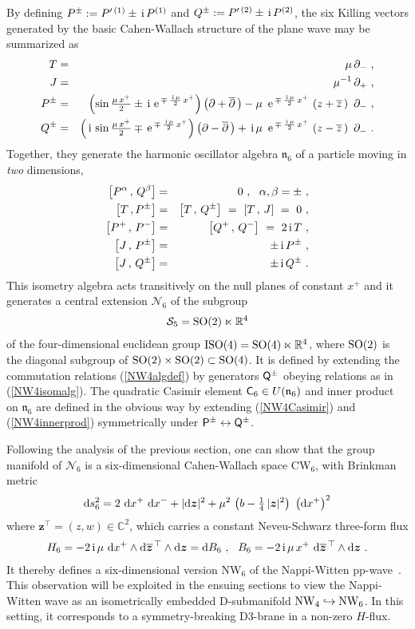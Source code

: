 \documentclass[11pt,a4paper]{article}
\newcommand{\ii}{{\rm i}}
\newcommand{\C}{\complex}
\newcommand{\mbf}[1]{{\boldsymbol {#1} }}
\def\ii{{\,{\rm i}\,}}
\def\dd{{\rm d}}
\def\P{{\sf P}}
\def\Q{{\sf Q}}
\def\C{{\sf C}}
\def\J{{\sf J}}
\def\mz{{\mbf z}}
\newcommand{\complex}{{\mathbb C}} %
\newcommand{\real}{{\mathbb R}} %
\def\nn{\nonumber}
\def\e{{\,\rm e}\,}
\def\bea{\begin{eqnarray}}
\def\eea{\end{eqnarray}}
\newcommand{\beq}{\begin{eqnarray}}
\newcommand{\eeq}{\end{eqnarray}}
\begin{document}
By defining $P^\pm:=P^{\prime\,(1)}\pm\ii P^{(1)}$ and
$ Q{}^{\pm}:=P^{\prime\,(2)}\pm\ii P^{(2)}$, the six
Killing vectors generated by the basic Cahen-Wallach structure of the
plane wave may be summarized as
\bea
T&=&\mu\,\partial_- \ , \nn\\J&=&\mu^{-1}\,\partial_+ \ , \nn\\
P^\pm&=&\left(\sin\mbox{$\frac{\mu\,x^+}2$}\pm\ii\e^{\mp\,
\frac{\ii\mu}2\,x^+}\right)
\left(\partial+\overline{\partial}\,\right)-\mu~\e^{\mp\,
\frac{\ii\mu}2\,x^+}\,\left(
z+\overline{z}\,\right)~\partial_- \ , \nn
\\ Q{}^{\pm}&=&\left(\ii\sin\mbox{$\frac{\mu\,x^+}2$}\mp
\e^{\mp\,\frac{\ii\mu}2\,x^+}\right)
\left(\partial-\overline{\partial}\,\right)+\ii\mu~\e^{\mp\,
\frac{\ii\mu}2\,x^+}\,\left(
z-\overline{z}\,\right)~\partial_- \ .
\label{6CWKilling}\eea
Together, they generate the harmonic oscillator algebra
$\mathfrak{n}_6$ of a particle moving in {\it two} dimensions,
\bea
\left[P^\alpha\,,\, Q{}^{\beta}\right]&=&0 \ , ~~
\alpha,\beta=\pm \ , \nn\\\left[T\,,P^\pm\right]&=&\left[T
\,,\, Q{}^{\pm}\right]~=~\left[T\,,\,J\right]~=~0 \ ,
\nn\\\left[P^+\,,\,P^-\right]&=&\left[Q{}^{+}\,,\,
 Q{}^{-}\right]~=~2\ii T \ , \nn\\\left[J\,,\,
P^\pm\right]&=&\pm\ii P^\pm \ , \nn\\\left[J\,,\, Q{}^{
\pm}\right]&=&\pm\ii Q{}^{\pm} \ .
\label{NW4isomalg}\eea
This isometry algebra acts transitively on the null planes of constant
  $x^+$ and it generates a central extension ${\mathcal
  N}_6$ of the subgroup
\beq
\mathcal{S}_5={\rm SO}(2)\ltimes\real^4
\label{S5subgp}\eeq
of the four-dimensional euclidean group ${\rm
  ISO}(4)={\rm SO}(4)\ltimes\real^4$, where ${\rm SO}(2)$ is the
diagonal subgroup of ${\rm SO}(2)\times{\rm SO}(2)\subset{\rm SO}(4)$.
It is defined by extending the commutation relations (\ref{NW4algdef})
by generators $\Q^{\pm}$ obeying relations as in
(\ref{NW4isomalg}). The quadratic Casimir element $\C_6\in
U(\mathfrak{n}_6)$ and inner product on $\mathfrak{n}_6$ are defined
in the obvious way by extending (\ref{NW4Casimir}) and
(\ref{NW4innerprod}) symmetrically under
$\P^\pm\leftrightarrow\Q^\pm$.

Following the analysis of the previous section, one can show that the
group manifold of ${\mathcal N}_6$ is a six-dimensional Cahen-Wallach
space CW$_6$, with Brinkman metric
\beq
\dd s_6^2=2~\dd x^+~\dd x^-+|\dd\mz|^2+\mu^2\,\left(b-\mbox{$\frac14$}\,
|\mz|^2\right)~\left(\dd x^+\right)^2
\label{NW6metricBrink}\eeq
where $\mz^\top=(z,w)\in\complex^2$, which carries a constant
Neveu-Schwarz three-form flux
\beq
H_6=-2\ii\mu~\dd x^+\wedge\dd\overline{\mz}{}^{\,\top}
\wedge\dd\mz=\dd B_6 \ , ~~
B_6=-2\ii\mu\,x^+~\dd\overline{\mz}{}^{\,\top}\wedge\dd\mz \ .
\label{NW6Bfield}\eeq
It thereby defines a six-dimensional version NW$_6$ of the
Nappi-Witten pp-wave~\cite{KM1}. This observation will be exploited in the
ensuing sections to view the Nappi-Witten wave as an isometrically
embedded D-submanifold ${\rm NW}_4\hookrightarrow{\rm NW}_6$. In this
setting, it corresponds to a symmetry-breaking D3-brane in a non-zero
$H$-flux.
\end{document}
